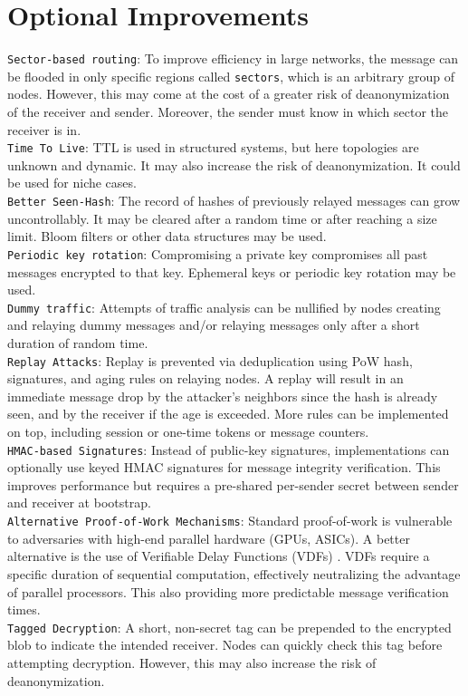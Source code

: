 \documentclass{article}
\begin{document}
\section{Optional Improvements}
\texttt{Sector-based routing}: To improve efficiency in large networks, the message can be flooded in only specific regions called \texttt{sectors}, which is an arbitrary group of nodes. However, this may come at the cost of a greater risk of deanonymization of the receiver and sender. Moreover, the sender must know in which sector the receiver is in.\\
\texttt{Time To Live}: TTL is used in structured systems, but here topologies are unknown and dynamic. It may also increase the risk of deanonymization. It could be used for niche cases.\\
\texttt{Better Seen-Hash}: The record of hashes of previously relayed messages can grow uncontrollably. It may be cleared after a random time or after reaching a size limit. Bloom filters or other data structures may be used.\\
\texttt{Periodic key rotation}: Compromising a private key compromises all past messages encrypted to that key. Ephemeral keys or periodic key rotation may be used.\\
\texttt{Dummy traffic}: Attempts of traffic analysis can be nullified by nodes creating and relaying dummy messages and/or relaying messages only after a short duration of random time.\\
\texttt{Replay Attacks}: Replay is prevented via deduplication using PoW hash, signatures, and aging rules on relaying nodes. A replay will result in an immediate message drop by the attacker's neighbors since the hash is already seen, and by the receiver if the age is exceeded. More rules can be implemented on top, including session or one-time tokens or message counters.\\
\texttt{HMAC-based Signatures}: Instead of public-key signatures, implementations can optionally use keyed HMAC signatures for message integrity verification. This improves performance but requires a pre-shared per-sender secret between sender and receiver at bootstrap.\\
\texttt{Alternative Proof-of-Work Mechanisms}: Standard proof-of-work is vulnerable to adversaries with high-end parallel hardware (GPUs, ASICs). A better alternative is the use of Verifiable Delay Functions (VDFs) \cite{vdf2019}. VDFs require a specific duration of sequential computation, effectively neutralizing the advantage of parallel processors. This also providing more predictable message verification times.\\
\texttt{Tagged Decryption}: A short, non-secret tag can be prepended to the encrypted blob to indicate the intended receiver. Nodes can quickly check this tag before attempting decryption. However, this may also increase the risk of deanonymization.\\
\end{document}
